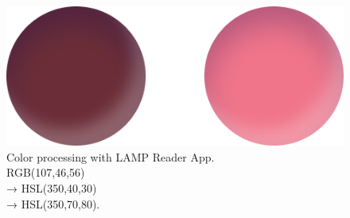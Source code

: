 \begin{figure}[h]
    \centering
    \includegraphics[width=\linewidth]{mnt/fig/lamp-reader-app-color}
    \caption{Color processing with LAMP Reader App.\\
    RGB(107,46,56)\\
    → HSL(350,40,30)\\
    → HSL(350,70,80).}
    \label{fig:my_label}
\end{figure}
